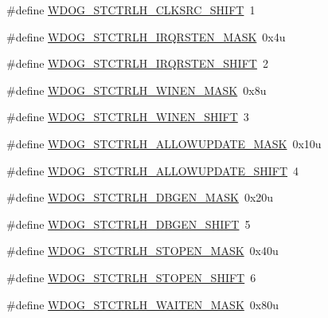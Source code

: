 \begin{DoxyCompactItemize}
\#define \hyperlink{group___w_d_o_g___register___masks_gaa437494e2c4bb2952986b89d4a52f2bf}{W\+D\+O\+G\+\_\+\+S\+T\+C\+T\+R\+L\+H\+\_\+\+C\+L\+K\+S\+R\+C\+\_\+\+S\+H\+I\+FT}~1
\item 
\#define \hyperlink{group___w_d_o_g___register___masks_ga64ebb40c66318cac7631c3fd467c846a}{W\+D\+O\+G\+\_\+\+S\+T\+C\+T\+R\+L\+H\+\_\+\+I\+R\+Q\+R\+S\+T\+E\+N\+\_\+\+M\+A\+SK}~0x4u
\item 
\#define \hyperlink{group___w_d_o_g___register___masks_ga0b519bf4ae17a11b51878819d4249e00}{W\+D\+O\+G\+\_\+\+S\+T\+C\+T\+R\+L\+H\+\_\+\+I\+R\+Q\+R\+S\+T\+E\+N\+\_\+\+S\+H\+I\+FT}~2
\item 
\#define \hyperlink{group___w_d_o_g___register___masks_ga74edc83d2a673f012aeff6410a8be861}{W\+D\+O\+G\+\_\+\+S\+T\+C\+T\+R\+L\+H\+\_\+\+W\+I\+N\+E\+N\+\_\+\+M\+A\+SK}~0x8u
\item 
\#define \hyperlink{group___w_d_o_g___register___masks_gae0770ee0a74441bd3d2e0d3c291ca4b6}{W\+D\+O\+G\+\_\+\+S\+T\+C\+T\+R\+L\+H\+\_\+\+W\+I\+N\+E\+N\+\_\+\+S\+H\+I\+FT}~3
\item 
\#define \hyperlink{group___w_d_o_g___register___masks_gaf524a1ad1f811741b27f29836d6137ee}{W\+D\+O\+G\+\_\+\+S\+T\+C\+T\+R\+L\+H\+\_\+\+A\+L\+L\+O\+W\+U\+P\+D\+A\+T\+E\+\_\+\+M\+A\+SK}~0x10u
\item 
\#define \hyperlink{group___w_d_o_g___register___masks_gaf2ae60bccb334321f860b2480d916604}{W\+D\+O\+G\+\_\+\+S\+T\+C\+T\+R\+L\+H\+\_\+\+A\+L\+L\+O\+W\+U\+P\+D\+A\+T\+E\+\_\+\+S\+H\+I\+FT}~4
\item 
\#define \hyperlink{group___w_d_o_g___register___masks_ga837911a61f223e74ea90cca76f08a787}{W\+D\+O\+G\+\_\+\+S\+T\+C\+T\+R\+L\+H\+\_\+\+D\+B\+G\+E\+N\+\_\+\+M\+A\+SK}~0x20u
\item 
\#define \hyperlink{group___w_d_o_g___register___masks_ga9fdcaa733bd0393d4bce730c1d2c90c5}{W\+D\+O\+G\+\_\+\+S\+T\+C\+T\+R\+L\+H\+\_\+\+D\+B\+G\+E\+N\+\_\+\+S\+H\+I\+FT}~5
\item 
\#define \hyperlink{group___w_d_o_g___register___masks_gab78af949041ea10c257c8276c8e2782a}{W\+D\+O\+G\+\_\+\+S\+T\+C\+T\+R\+L\+H\+\_\+\+S\+T\+O\+P\+E\+N\+\_\+\+M\+A\+SK}~0x40u
\item 
\#define \hyperlink{group___w_d_o_g___register___masks_ga46b2b7b0c6a5938cfa26d96ba332d5d0}{W\+D\+O\+G\+\_\+\+S\+T\+C\+T\+R\+L\+H\+\_\+\+S\+T\+O\+P\+E\+N\+\_\+\+S\+H\+I\+FT}~6
\item 
\#define \hyperlink{group___w_d_o_g___register___masks_gad6e2dd88be51a78f133085bb0df3a5f9}{W\+D\+O\+G\+\_\+\+S\+T\+C\+T\+R\+L\+H\+\_\+\+W\+A\+I\+T\+E\+N\+\_\+\+M\+A\+SK}~0x80u

\end{DoxyCompactItemize}
